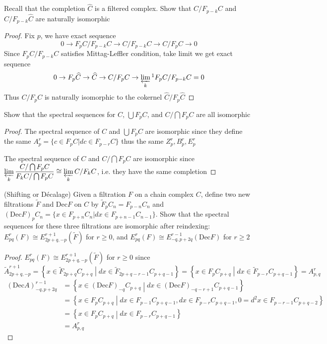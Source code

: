 \documentclass{article}
\newenvironment{exercise}[2][Exercise]{\begin{trivlist}
\item[\hskip \labelsep {\bfseries #1}\hskip \labelsep {\bfseries #2.}]}{\end{trivlist}}
\theoremstyle{definition}
\theoremstyle{remark}
\theoremstyle{definition}
\begin{document}
\begin{exercise}{\textbf{5.4.1}}
Recall that the completion $\widehat C$ is a filtered complex. Show that $C/F_{p-k}C$ and $\widehat C/F_{p-k}\widehat C$ are naturally isomorphic
\end{exercise}

\begin{proof}
Fix $p$, we have exact sequence
\[0\to F_pC/F_{p-k}C\to C/F_{p-k}C\to C/F_pC\to 0\]
Since $F_pC/F_{p-k}C$ satisfies Mittag-Leffler condition, take limit we get exact sequence
\[0\to F_p\widehat{C}\to\widehat C\to C/F_pC\to\varprojlim_k\textstyle^1{F_pC/F_{p-k}C}=0\]
Thus $C/F_pC$ is naturally isomorphic to the cokernel $\widehat C/F_p\widehat{C}$
\end{proof}

\begin{exercise}{\textbf{5.4.2}}
Show that the spectral sequences for $C$, $\bigcup F_pC$, and $C/\bigcap F_pC$ are all isomorphic
\end{exercise}

\begin{proof}
The spectral sequence of $C$ and $\bigcup F_pC$ are isomorphic since they define the same $A^r_p=\{c\in F_pC|dc\in F_{p-r}C\}$ thus the same $Z^r_p,B^r_p,E^r_p$ \par
The spectral sequence of $C$ and $C/\bigcap F_pC$ are isomorphic since $\displaystyle\varprojlim_k\dfrac{C/\bigcap F_pC}{F_kC/\bigcap F_pC}\cong\varprojlim_k C/F_kC$, i.e. they have the same completion
\end{proof}

\begin{exercise}{\textbf{5.4.3}}(Shifting or D\'ecalage) Given a filtration $F$ on a chain complex $C$, define two new filtrations $\widetilde F$ and $\mathrm{Dec} F$ on $C$ by $\widetilde F_pC_n=F_{p-n}C_n$ and $(\mathrm{Dec}F)_pC_n=\{x\in F_{p+n}C_n|dx\in F_{p+n-1}C_{n-1}\}$. Show that the spectral sequences for these three filtrations are isomorphic after reindexing: $E^r_{pq}(F)\cong E^{r+1}_{2p+q,-p}(\widetilde F)$ for $r\geq0$, and $E^r_{pq}(F)\cong{} E^{r-1}_{-q,p+2q}(\mathrm{Dec} F)$ for $r\geq2$
\end{exercise}

\begin{proof}
$E^r_{pq}(F)\cong E^{r+1}_{2p+q,-p}(\widetilde F)$ for $r\geq0$ since
\[\widetilde A^{r+1}_{2p+q,-p}=\left\{x\in\widetilde F_{2p+q}C_{p+q}\middle|dx\in\widetilde F_{2p+q-r-1}C_{p+q-1}\right\}=\left\{x\in F_{p}C_{p+q}\middle|dx\in\widetilde F_{p-r}C_{p+q-1}\right\}=A^r_{p,q}\]
\begin{align*}
(\mathrm{Dec}A)^{r-1}_{-q,p+2q}&=\left\{x\in (\mathrm{Dec}F)_{-q}C_{p+q}\middle|dx\in(\mathrm{Dec}F)_{-q-r+1}C_{p+q-1}\right\} \\
&=\left\{x\in F_pC_{p+q}\middle|dx\in F_{p-1}C_{p+q-1},dx\in F_{p-r}C_{p+q-1},0=d^2x\in F_{p-r-1}C_{p+q-2}\right\} \\
&=\left\{x\in F_pC_{p+q}\middle|dx\in F_{p-r}C_{p+q-1}\right\} \\
&= A^r_{p,q}
\end{align*}
\end{proof}
\end{document}
